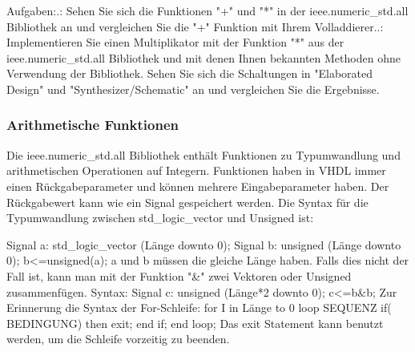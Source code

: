 \documentclass{article}
\begin{document}
Aufgaben:.: Sehen Sie sich die Funktionen "+" und "*" in der ieee.numeric\_std.all Bibliothek an und vergleichen Sie die "+" Funktion mit Ihrem Volladdierer..: Implementieren Sie einen Multiplikator mit der Funktion "*" aus der ieee.numeric\_std.all Bibliothek und mit denen Ihnen bekannten Methoden ohne Verwendung der Bibliothek. Sehen Sie sich die Schaltungen in "Elaborated Design" und "Synthesizer/Schematic" an und vergleichen Sie die Ergebnisse.\newline

\subsubsection{Arithmetische Funktionen}
Die ieee.numeric\_std.all Bibliothek enth\"alt Funktionen zu Typumwandlung und arithmetischen Operationen auf Integern. Funktionen haben in VHDL immer einen R\"uckgabeparameter und k\"onnen mehrere Eingabeparameter haben. Der R\"uckgabewert kann wie ein Signal gespeichert werden. Die Syntax f\"ur die Typumwandlung zwischen std\_logic\_vector und Unsigned ist:\newline

Signal a: std\_logic\_vector (Länge downto 0);\newline
Signal b: unsigned (L\"ange downto 0);\newline
b<=unsigned(a);\newline
a und b m\"ussen die gleiche L\"ange haben. Falls dies nicht der Fall ist, kann man mit der Funktion "\&" zwei Vektoren oder Unsigned zusammenf\"ugen. Syntax:\newline
Signal c: unsigned (Länge*2 downto 0);\newline
c<=b\&b;\newline
Zur Erinnerung die Syntax der For-Schleife:\newline
for I in L\"ange to 0 loop\newline
SEQUENZ\newline
if( BEDINGUNG) then\newline
exit;\newline
end if;\newline
end loop;\newline
Das exit Statement kann benutzt werden, um die Schleife vorzeitig zu beenden.\newline
\end{document}
